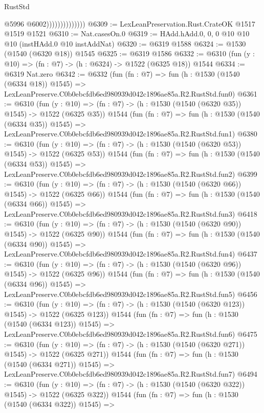 \begin{lexlean}{RustStd}
\begin{coremodule}
                                @5996
                                @6002))))))))))))))
@6309 := LexLeanPreservation.Rust.CrateOK @1517 @1519 @1521
@6310 := Nat.casesOn.{0}
@6319 := HAdd.hAdd.{0, 0, 0} @10 @10 @10 (instHAdd.{0} @10 instAddNat)
@6320 := @6319 @1588
@6324 := @1530 (@1540 (@6320 @18)) @1545
@6325 := @6319 @1586
@6332 := @6310 (fun (y : @10) => (fn : @7) -> (h : @6324) -> @1522 (@6325 @18)) @1544
@6334 := @6319 Nat.zero
@6342 := @6332
    (fun (fn : @7) =>
    fun (h : @1530 (@1540 (@6334 @18)) @1545) =>
    LexLeanPreserve.C0b0ebcfdb6ed980939d042c1896ae85a.R2.RustStd.fun0)
@6361 := @6310
    (fun (y : @10) => (fn : @7) -> (h : @1530 (@1540 (@6320 @35)) @1545) -> @1522 (@6325 @35))
    @1544
    (fun (fn : @7) =>
    fun (h : @1530 (@1540 (@6334 @35)) @1545) =>
    LexLeanPreserve.C0b0ebcfdb6ed980939d042c1896ae85a.R2.RustStd.fun1)
@6380 := @6310
    (fun (y : @10) => (fn : @7) -> (h : @1530 (@1540 (@6320 @53)) @1545) -> @1522 (@6325 @53))
    @1544
    (fun (fn : @7) =>
    fun (h : @1530 (@1540 (@6334 @53)) @1545) =>
    LexLeanPreserve.C0b0ebcfdb6ed980939d042c1896ae85a.R2.RustStd.fun2)
@6399 := @6310
    (fun (y : @10) => (fn : @7) -> (h : @1530 (@1540 (@6320 @66)) @1545) -> @1522 (@6325 @66))
    @1544
    (fun (fn : @7) =>
    fun (h : @1530 (@1540 (@6334 @66)) @1545) =>
    LexLeanPreserve.C0b0ebcfdb6ed980939d042c1896ae85a.R2.RustStd.fun3)
@6418 := @6310
    (fun (y : @10) => (fn : @7) -> (h : @1530 (@1540 (@6320 @90)) @1545) -> @1522 (@6325 @90))
    @1544
    (fun (fn : @7) =>
    fun (h : @1530 (@1540 (@6334 @90)) @1545) =>
    LexLeanPreserve.C0b0ebcfdb6ed980939d042c1896ae85a.R2.RustStd.fun4)
@6437 := @6310
    (fun (y : @10) => (fn : @7) -> (h : @1530 (@1540 (@6320 @96)) @1545) -> @1522 (@6325 @96))
    @1544
    (fun (fn : @7) =>
    fun (h : @1530 (@1540 (@6334 @96)) @1545) =>
    LexLeanPreserve.C0b0ebcfdb6ed980939d042c1896ae85a.R2.RustStd.fun5)
@6456 := @6310
    (fun (y : @10) => (fn : @7) -> (h : @1530 (@1540 (@6320 @123)) @1545) -> @1522 (@6325 @123))
    @1544
    (fun (fn : @7) =>
    fun (h : @1530 (@1540 (@6334 @123)) @1545) =>
    LexLeanPreserve.C0b0ebcfdb6ed980939d042c1896ae85a.R2.RustStd.fun6)
@6475 := @6310
    (fun (y : @10) => (fn : @7) -> (h : @1530 (@1540 (@6320 @271)) @1545) -> @1522 (@6325 @271))
    @1544
    (fun (fn : @7) =>
    fun (h : @1530 (@1540 (@6334 @271)) @1545) =>
    LexLeanPreserve.C0b0ebcfdb6ed980939d042c1896ae85a.R2.RustStd.fun7)
@6494 := @6310
    (fun (y : @10) => (fn : @7) -> (h : @1530 (@1540 (@6320 @322)) @1545) -> @1522 (@6325 @322))
    @1544
    (fun (fn : @7) =>
    fun (h : @1530 (@1540 (@6334 @322)) @1545) =>

\end{coremodule}
\end{lexlean}
